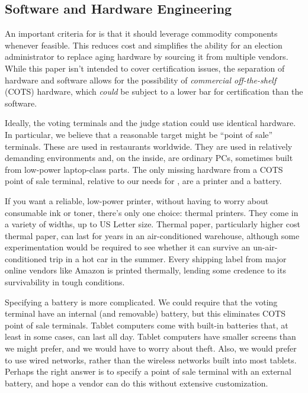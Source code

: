 \subsection{Software and Hardware Engineering}

An important criteria for \projname is that it should leverage commodity components whenever feasible. This reduces cost and simplifies the ability for an election administrator to replace aging hardware by sourcing it from multiple vendors. While this paper isn't intended to cover certification issues, the separation of hardware and software allows for the possibility of {\em commercial off-the-shelf} (COTS) hardware, which {\em could} be subject to a lower bar for certification than the software.

Ideally, the voting terminals and the judge station could use identical hardware. In particular, we believe that a reasonable target might be ``point of sale'' terminals. These are used in restaurants worldwide. They are used in relatively demanding environments and, on the inside, are ordinary PCs, sometimes built from low-power laptop-class parts. The only missing hardware from a COTS point of sale terminal, relative to our needs for \projname, are a printer and a battery.

If you want a reliable, low-power printer, without having to worry about consumable ink or toner, there's only one choice: thermal printers. They come in a variety of widths, up to US Letter size. Thermal paper, particularly higher cost thermal paper, can last for years in an air-conditioned warehouse, although some experimentation would be required to see whether it can survive an un-air-conditioned trip in a hot car in the summer. Every shipping label from major online vendors like Amazon is printed thermally, lending some credence to its survivability in tough conditions.

Specifying a battery is more complicated. We could require that the voting terminal have an internal (and removable) battery, but this eliminates COTS point of sale terminals. Tablet computers come with built-in batteries that, at least in some cases, can last all day. Tablet computers have smaller screens than we might prefer, and we would have to worry about theft. Also, we would prefer to use wired networks, rather than the wireless networks built into most tablets. Perhaps the right answer is to specify a point of sale terminal with an external battery, and hope a vendor can do this without extensive customization.

